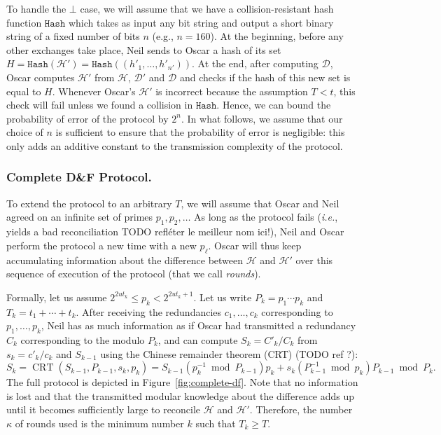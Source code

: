 \documentclass[11pt]{llncs}
\newcommand{\Set}{\mathcal{H}}
\newcommand{\SetD}{\mathcal{D}}
\newcommand{\df}{D\&F\xspace}
\newcommand{\ie}{\textit{i.e.}\xspace}
\newcommand{\Hash}{\ensuremath{\mathtt{Hash}}}
\DeclareMathOperator{\CRT}{CRT}
\begin{document}
To handle the $\bot$ case, we will assume that we have a collision-resistant hash function $\Hash$ which takes as input any bit string and output a short binary string of a fixed number of bits $n$ (e.g., $n=160$).
At the beginning, before any other exchanges take place, Neil sends to Oscar a hash of its set $H = \Hash(\Set') = \Hash((h'_1,\dots,h'_{n'}))$. At the end, after computing $\SetD$, Oscar computes $\Set'$ from $\Set$, $\SetD'$ and $\SetD$ and checks if the hash of this new set is equal to $H$.
Whenever Oscar's $\Set'$ is incorrect because the assumption $T < t$, this check will fail unless we found a collision in $\Hash$. Hence, we can bound the probability of error of the protocol by $2^n$. In what follows, we assume that our choice of $n$ is sufficient to ensure that the probability of error is negligible: this only adds an additive constant to the transmission complexity of the protocol.

\subsubsection{Complete \df Protocol.}
\label{sec:complete-df}

To extend the protocol to an arbitrary $T$, we will assume that Oscar and Neil agreed on an infinite set of primes $p_1,p_2,\ldots$ As long as the protocol fails (\ie, yields a bad reconciliation TODO refléter le meilleur nom ici!), Neil and Oscar perform the protocol a new time with a new $p_\ell$. Oscar will thus keep accumulating information about the difference between $\Set$ and $\Set'$ over this sequence of execution of the protocol (that we call \emph{rounds}).

Formally, let us assume $2^{2 u t_k} \le p_k < 2^{2 u t_k +1}$.
Let us write $P_k = p_1 \cdots p_k$ and $T_k = t_1 + \cdots + t_k$.
After receiving the redundancies $c_1,\dots,c_k$ corresponding to $p_1,\dots,p_k$, Neil has as much information as if Oscar had transmitted a redundancy $C_k$ corresponding to the modulo $P_k$, and can compute $S_k = C'_k / C_k$ from $s_k = c'_k/c_k$ and $S_{k-1}$ using the Chinese remainder theorem (CRT) (TODO ref ?): 
\[ S_k = \CRT(S_{k-1},P_{k-1},s_k,p_k) = S_{k-1} (p_k^{-1} \bmod P_{k-1}) p_k + s_k (P_{k-1}^{-1} \bmod p_k) P_{k-1} \bmod P_k. \]
The full protocol is depicted in Figure~\ref{fig:complete-df}.
Note that no information is lost and that the transmitted modular knowledge about the difference adds up until it becomes sufficiently large to reconcile $\Set$ and $\Set'$.
Therefore, the number $\kappa$ of rounds used is the minimum number $k$ such that $T_k \ge T$.
\end{document}
